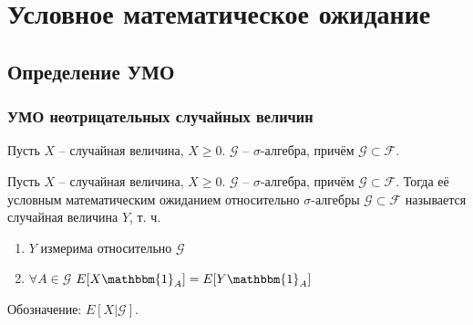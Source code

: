 \section{Условное математическое ожидание}

    \subsection{Определение УМО}
        \subsubsection{УМО неотрицательных случайных величин}
    
        Пусть $X$ -- случайная величина, $X\ge0$. 
        $\mathcal{G}$ -- $\sigma$-алгебра, причём $\mathcal{G}\subset\mathcal{F}$.
        \begin{definition}\label{extralect:def1}
            Пусть $X$ -- случайная величина, $X\ge0$. $\mathcal{G}$ -- $\sigma$-алгебра, причём $\mathcal{G}\subset\mathcal{F}$. Тогда её условным математическим ожиданием относительно
            $\sigma$-алгебры $\mathcal{G}\subset\mathcal{F}$ называется случайная величина $Y$, т. ч.
            \begin{enumerate}
                \item $Y$ измерима относительно $\mathcal{G}$
                \item $\forall A\in \mathcal{G}$ $E[X\mathbbm{1}_{A}] = E[Y\mathbbm{1}_{A}]$ 
            \end{enumerate}
            Обозначение: $E[X|\mathcal{G}]$.
        \end{definition}

